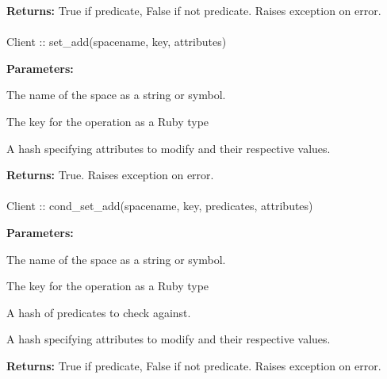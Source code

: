\noindent\textbf{Returns:}
True if predicate, False if not predicate.  Raises exception on error.

\paragraph{}
\label{api:ruby:set_add}
\begin{ccode}
Client :: set_add(spacename, key, attributes)
\end{ccode}
\funcdesc 

\noindent\textbf{Parameters:}
\begin{description}[labelindent=\widthof{{\code{attributes}}},leftmargin=*,noitemsep,nolistsep,align=right]
\item[\code{spacename}] The name of the space as a string or symbol.
\item[\code{key}] The key for the operation as a Ruby type
\item[\code{attributes}] A hash specifying attributes to modify and their respective values.
\end{description}

\noindent\textbf{Returns:}
True.  Raises exception on error.

\paragraph{}
\label{api:ruby:cond_set_add}
\begin{ccode}
Client :: cond_set_add(spacename, key, predicates, attributes)
\end{ccode}
\funcdesc 

\noindent\textbf{Parameters:}
\begin{description}[labelindent=\widthof{{\code{predicates}}},leftmargin=*,noitemsep,nolistsep,align=right]
\item[\code{spacename}] The name of the space as a string or symbol.
\item[\code{key}] The key for the operation as a Ruby type
\item[\code{predicates}] A hash of predicates to check against.
\item[\code{attributes}] A hash specifying attributes to modify and their respective values.
\end{description}

\noindent\textbf{Returns:}
True if predicate, False if not predicate.  Raises exception on error.

